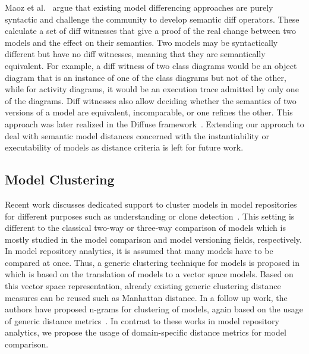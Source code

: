 Maoz et al.~\cite{MaozRR10} argue that existing model differencing approaches are purely syntactic and
challenge the community to develop semantic diff operators. These calculate a set of diff witnesses that give
a proof of the real change between two models and the effect on their semantics. Two models may be syntactically
different but have no diff witnesses, meaning that they are semantically equivalent. For example, a diff witness
of two class diagrams would be an object diagram that is an instance of one of the class diagrams but not of
the other, while for activity diagrams, it would be an execution trace admitted by only one of the diagrams.
Diff witnesses also allow deciding whether the semantics of two versions of a model are equivalent, incomparable,
or one refines the other. This approach was later realized in the Diffuse framework~\cite{MaozR18}.
Extending our approach to deal with semantic model distances concerned with the instantiability or
executability of models as distance criteria is left for future work.

\subsection{Model Clustering}

Recent work discusses dedicated support to cluster models in model repositories for different purposes such as understanding or clone detection~\cite{BaburCB18,BaburCVB16,BaburC17}. This setting is different to the classical two-way or three-way comparison of models which is mostly studied in the model comparison and model versioning fields, respectively. In model repository analytics, it is assumed that many models have to be compared at once. Thus, a generic clustering technique for models is proposed in~\cite{BaburCVB16} which is based on the translation of models to a vector space models. Based on this vector space representation, already existing generic clustering distance measures can be reused such as Manhattan distance. In a follow up work, the authors have proposed n-grams for clustering of models, again based on the usage of generic distance metrics~\cite{BaburC17,BaburCB18}. In contrast to these works in model repository analytics, we propose the usage of domain-specific distance metrics for model comparison. 
